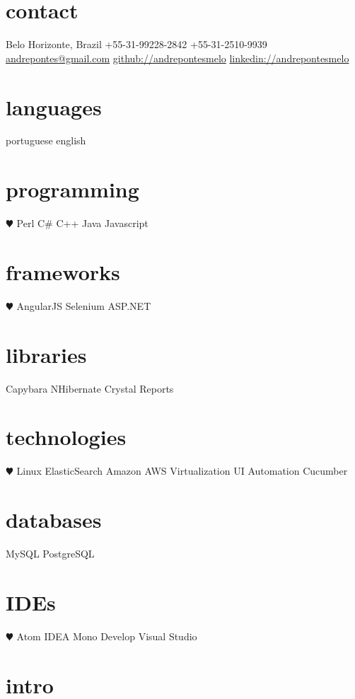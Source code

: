 \documentclass[]{friggeri-cv}
\begin{document}


\begin{aside}
\section{contact}
Belo Horizonte, Brazil
+55-31-99228-2842
+55-31-2510-9939
~
\href{mailto:andrepontes@gmail.com}{andrepontes@gmail.com}
\href{https://github.com/andrepontesmelo}{github://andrepontesmelo}
\href{https://br.linkedin.com/in/andrepontesmelo}{linkedin://andrepontesmelo}
\section{languages}
portuguese
english
\section{programming}
{\color{red} $\varheartsuit$} Perl
C\#
C++
Java
Javascript
\section{frameworks}
{\color{red} $\varheartsuit$} AngularJS
Selenium
ASP.NET
\section{libraries}
Capybara
NHibernate
Crystal Reports
\section{technologies}
 {\color{red} $\varheartsuit$} Linux
ElasticSearch
Amazon AWS
Virtualization
UI Automation
Cucumber
\section{databases}
MySQL
PostgreSQL
\section{IDEs}
{\color{red} $\varheartsuit$} Atom
IDEA
Mono Develop
Visual Studio
\end{aside}
\section{intro}
\end{document}
